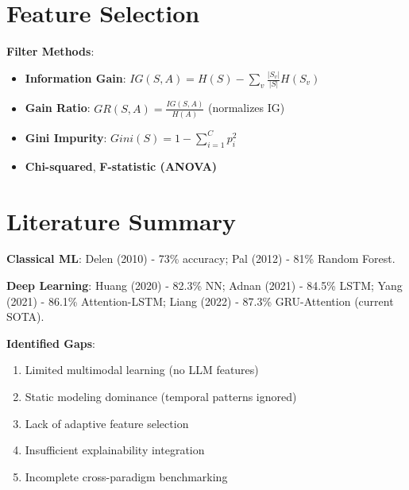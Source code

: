 \section{Feature Selection}

\textbf{Filter Methods}:
\begin{itemize}
\item \textbf{Information Gain}: $IG(S, A) = H(S) - \sum_{v} \frac{|S_v|}{|S|} H(S_v)$
\item \textbf{Gain Ratio}: $GR(S, A) = \frac{IG(S, A)}{H(A)}$ (normalizes IG)
\item \textbf{Gini Impurity}: $Gini(S) = 1 - \sum_{i=1}^{C} p_i^2$
\item \textbf{Chi-squared}, \textbf{F-statistic (ANOVA)}
\end{itemize}

\section{Literature Summary}

\textbf{Classical ML}: Delen (2010) - 73\% accuracy; Pal (2012) - 81\% Random Forest.

\textbf{Deep Learning}: Huang (2020) - 82.3\% NN; Adnan (2021) - 84.5\% LSTM; Yang (2021) - 86.1\% Attention-LSTM; Liang (2022) - 87.3\% GRU-Attention (current SOTA).

\textbf{Identified Gaps}:
\begin{enumerate}
\item Limited multimodal learning (no LLM features)
\item Static modeling dominance (temporal patterns ignored)
\item Lack of adaptive feature selection
\item Insufficient explainability integration
\item Incomplete cross-paradigm benchmarking
\end{enumerate}

